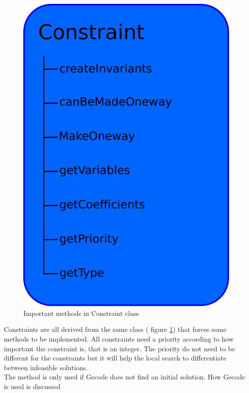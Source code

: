 \begin{figure}[!b]
\begin{center}
 \includegraphics[width=\linewidth/2]{constraint.pdf} \caption{Important methods in Constraint 
class}\label{fig_constraint}
\end{center} 
\end{figure}
Constraints are all derived from the same class ( figure \ref{fig_constraint}) that forces some 
methods to be implemented. All constraints need a priority according to how important the constraint is, that is an 
integer. The priority do not need to be different for the constraints but it will help the local search to 
differentiate between infeasible  
solutions. \\ 
The method  is only used if Gecode does not find an initial solution. How Gecode is used is discussed 
